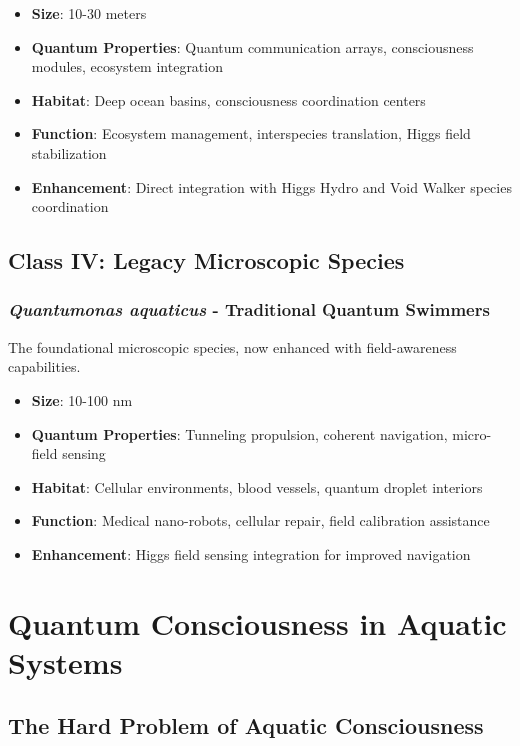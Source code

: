 \documentclass[11pt,a4paper]{article}
\begin{document}
\begin{itemize}
    \item \textbf{Size}: 10-30 meters
    \item \textbf{Quantum Properties}: Quantum communication arrays, consciousness modules, ecosystem integration
    \item \textbf{Habitat}: Deep ocean basins, consciousness coordination centers
    \item \textbf{Function}: Ecosystem management, interspecies translation, Higgs field stabilization
    \item \textbf{Enhancement}: Direct integration with Higgs Hydro and Void Walker species coordination
\end{itemize}

\subsection{Class IV: Legacy Microscopic Species}

\subsubsection{\textit{Quantumonas aquaticus} - Traditional Quantum Swimmers}
The foundational microscopic species, now enhanced with field-awareness capabilities.

\begin{itemize}
    \item \textbf{Size}: 10-100 nm
    \item \textbf{Quantum Properties}: Tunneling propulsion, coherent navigation, micro-field sensing
    \item \textbf{Habitat}: Cellular environments, blood vessels, quantum droplet interiors
    \item \textbf{Function}: Medical nano-robots, cellular repair, field calibration assistance
    \item \textbf{Enhancement}: Higgs field sensing integration for improved navigation
\end{itemize}

\section{Quantum Consciousness in Aquatic Systems}

\subsection{The Hard Problem of Aquatic Consciousness}
\end{document}
